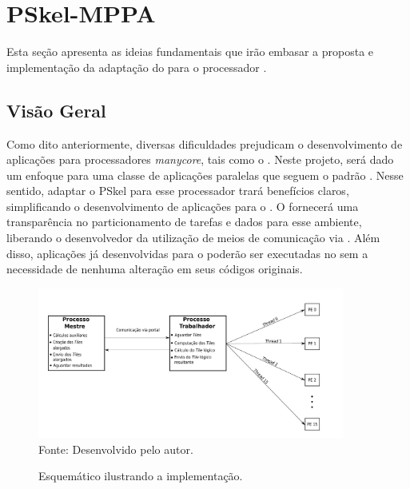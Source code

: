 \chapter{PSkel-MPPA}
\label{cha:proposta}

Esta seção apresenta as ideias fundamentais que irão embasar a proposta e implementação
da adaptação do \fw \pskel para o processador \mppa.

\section{Visão Geral}

Como dito anteriormente, diversas dificuldades prejudicam o desenvolvimento de aplicações para
processadores \textit{manycore}, tais como o \mppa. Neste projeto, será dado um enfoque para
uma classe de aplicações paralelas que seguem o padrão \stencil. Nesse sentido, adaptar
o \fw PSkel para esse processador trará benefícios claros, simplificando o desenvolvimento
de aplicações \stencil para o \mppa. O \fw fornecerá uma transparência
no particionamento de tarefas e dados para esse ambiente, liberando o desenvolvedor
da utilização de meios de comunicação via \noc. Além disso, aplicações já desenvolvidas para o
\fw poderão ser executadas no \mppa sem a necessidade de nenhuma alteração em seus códigos originais.



\begin{figure}[!h]
	\centering
    \caption{Esquemático ilustrando a implementação.}
    \includegraphics[width=0.9\textwidth]{figs/visaoGeralPSKELMPPA.pdf} \\
    Fonte: Desenvolvido pelo autor.
    \label{fig:tilingHalo}
\end{figure}



